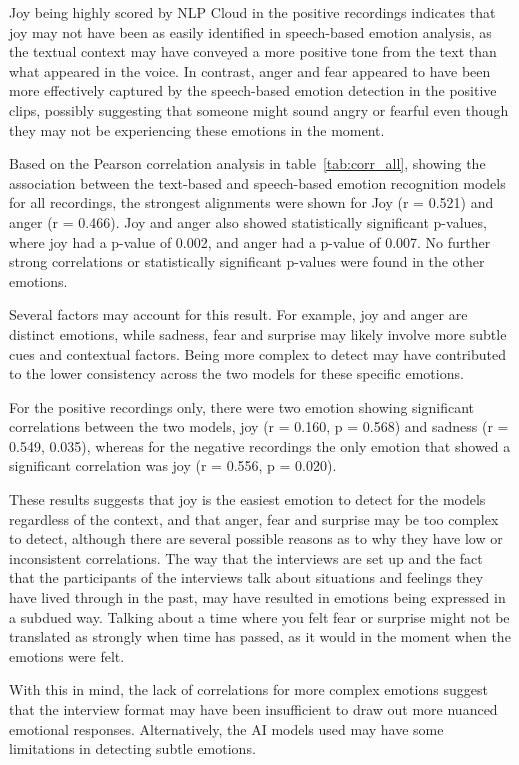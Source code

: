 Joy being highly scored by NLP Cloud in the positive recordings indicates that joy may not have been as easily identified in speech-based emotion analysis, as the textual context may have conveyed a more positive tone from the text than what appeared in the voice. In contrast, anger and fear appeared to have been more effectively captured by the speech-based emotion detection in the positive clips, possibly suggesting that someone might sound angry or fearful even though they may not be experiencing these emotions in the moment.



Based on the Pearson correlation analysis in table~\ref{tab:corr_all}, showing the association between the text-based and speech-based emotion recognition models for all recordings, the strongest alignments were shown for Joy (r = 0.521) and anger (r = 0.466). Joy and anger also showed statistically significant p-values, where joy had a p-value of 0.002, and anger had a p-value of 0.007. No further strong correlations or statistically significant p-values were found in the other emotions.

Several factors may account for this result. For example, joy and anger are distinct emotions, while sadness, fear and surprise may likely involve more subtle cues and contextual factors. Being more complex to detect may have contributed to the lower consistency across the two models for these specific emotions.

For the positive recordings only, there were two emotion showing significant correlations between the two models, joy (r = 0.160, p = 0.568) and sadness (r = 0.549, 0.035), whereas for the negative recordings the only emotion that showed a significant correlation was joy (r = 0.556, p = 0.020).

These results suggests that joy is the easiest emotion to detect for the models regardless of the context, and that anger, fear and surprise may be too complex to detect, although there are several possible reasons as to why they have low or inconsistent correlations. The way that the interviews are set up and the fact that the participants of the interviews talk about situations and feelings they have lived through in the past, may have resulted in emotions being expressed in a subdued way. Talking about a time where you felt fear or surprise might not be translated as strongly when time has passed, as it would in the moment when the emotions were felt.

With this in mind, the lack of correlations for more complex emotions suggest that the interview format may have been insufficient to draw out more nuanced emotional responses. Alternatively, the AI models used may have some limitations in detecting subtle emotions.


